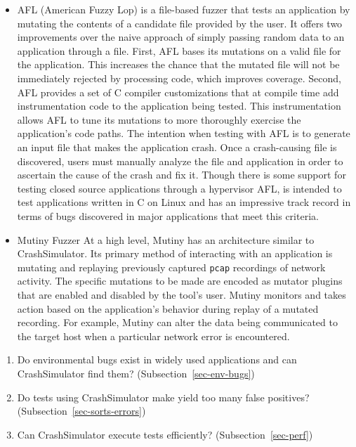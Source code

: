 \begin{itemize}

\item{AFL} (American Fuzzy Lop) is a file-based fuzzer that tests an
application by mutating the contents of a candidate file provided by
the user.  It offers two improvements over the naive approach of simply
passing random data to an application through a file.  First, AFL
bases its mutations on a valid file for the application.  This
increases the chance that the mutated file will not be immediately rejected
by
processing code, which improves coverage.  Second, AFL provides a set of
C compiler customizations
that at compile time add instrumentation code to the
application being tested.  This instrumentation
allows AFL to tune its mutations to more thoroughly exercise the
application's code paths.  The intention when testing with AFL is
to generate an input file that makes the application crash.  Once a
crash-causing file is discovered, users must manually analyze the
file and application in order to ascertain the cause of the crash
and fix it.  Though there is some support for testing closed source
applications through a hypervisor AFL, is intended to test
applications written in C on Linux and has an impressive track
record in terms of bugs discovered in major applications that meet
this criteria.

\item{Mutiny Fuzzer} At a high level, Mutiny has an architecture similar to
CrashSimulator.  Its primary method of interacting with an application
is mutating and replaying previously captured {\tt pcap} recordings
of network activity.  The specific mutations to be made are encoded
as mutator plugins that are enabled and disabled by the tool's
user.  Mutiny monitors and takes action based on the application's
behavior during replay of a mutated recording.  For example, Mutiny
can alter the data being communicated to the target host when a
particular network error is encountered.

\end{itemize}
\begin{enumerate}

\item{Do environmental bugs exist in widely used applications and can
      CrashSimulator find them? (Subsection~\ref{sec-env-bugs})}

\item{Do tests using CrashSimulator make yield too many false positives?
      (Subsection~\ref{sec-sorts-errors})}

\item{Can CrashSimulator
      execute tests efficiently? (Subsection~\ref{sec-perf})}

\end{enumerate}


